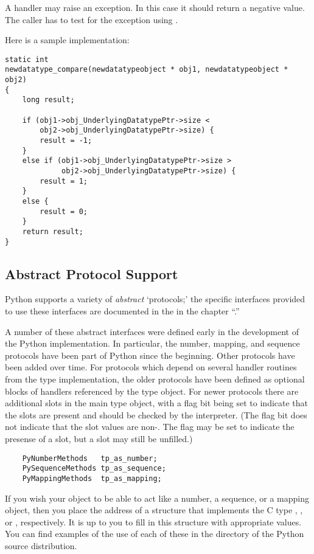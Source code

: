 A  handler may raise an exception.  In this case it
should return a negative value.  The caller has to test for the
exception using .


Here is a sample implementation:

\begin{verbatim}
static int
newdatatype_compare(newdatatypeobject * obj1, newdatatypeobject * obj2)
{
    long result;
 
    if (obj1->obj_UnderlyingDatatypePtr->size <
        obj2->obj_UnderlyingDatatypePtr->size) {
        result = -1;
    }
    else if (obj1->obj_UnderlyingDatatypePtr->size >
             obj2->obj_UnderlyingDatatypePtr->size) {
        result = 1;
    }
    else {
        result = 0;
    }
    return result;
}
\end{verbatim}


\subsection{Abstract Protocol Support}

Python supports a variety of \emph{abstract} `protocols;' the specific
interfaces provided to use these interfaces are documented in the
 in the
chapter ``.''

A number of these abstract interfaces were defined early in the
development of the Python implementation.  In particular, the number,
mapping, and sequence protocols have been part of Python since the
beginning.  Other protocols have been added over time.  For protocols
which depend on several handler routines from the type implementation,
the older protocols have been defined as optional blocks of handlers
referenced by the type object.  For newer protocols there are
additional slots in the main type object, with a flag bit being set to
indicate that the slots are present and should be checked by the
interpreter.  (The flag bit does not indicate that the slot values are
non-\NULL. The flag may be set to indicate the presense of a slot,
but a slot may still be unfilled.)

\begin{verbatim}
    PyNumberMethods   tp_as_number;
    PySequenceMethods tp_as_sequence;
    PyMappingMethods  tp_as_mapping;
\end{verbatim}

If you wish your object to be able to act like a number, a sequence,
or a mapping object, then you place the address of a structure that
implements the C type ,
, or , respectively.
It is up to you to fill in this structure with appropriate values. You
can find examples of the use of each of these in the 
directory of the Python source distribution.


